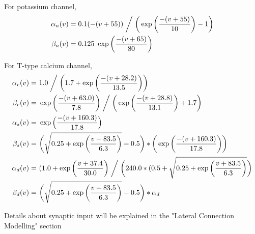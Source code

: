 For potassium channel, %
\begin{align*}
\alpha_{n}(v)&=0.1(-(v+55))  \biggm/  \bigg( \exp \bigg( \frac{-(v+55)}{10} \bigg) - 1 \bigg)\\
\beta_{n}(v)&=0.125\ \exp \bigg(\frac{-(v+65)}{80}\bigg)\\
\end{align*}

For T-type calcium channel, %
\begin{align*} %
\alpha_{r}(v) =&\ 1.0\biggm/ \bigg(1.7+\exp\bigg(\frac{-(v+28.2)}{13.5}\bigg)\bigg)  \\
\beta_{r}(v) =&\ \exp\bigg(\frac{-(v+63.0)}{7.8}\bigg) \biggm/  \bigg( \exp \bigg( \frac{-(v+28.8)}{13.1} \bigg) +1.7\bigg)\\
\alpha_{s}(v) =&\ \exp \Big(\frac{-(v+160.3)}{17.8}\Big)\\
\beta_{s}(v) =&\ \bigg(\sqrt{0.25+\exp\bigg(\frac{v+83.5}{6.3}\bigg)}-0.5\bigg) *  \bigg(\exp\bigg(\frac{-(v+160.3)}{17.8}\bigg)\bigg)\\
\alpha_{d}(v) =&\ (1.0+\exp\bigg(\frac{v+37.4}{30.0}\bigg) \biggm/ \bigg(240.0*(0.5+ \sqrt{0.25+\exp\bigg(\frac{v+83.5}{6.3} \bigg) } \bigg) \\
\beta_{d}(v) =&\ \bigg(\sqrt{0.25+\exp\bigg(\frac{v+83.5}{6.3} \bigg) } -0.5\bigg)*\alpha_d\\  
\end{align*}

%
%
%
%
Details about synaptic input will be explained in the "Lateral Connection Modelling" section



%
%
%
%
%
%

